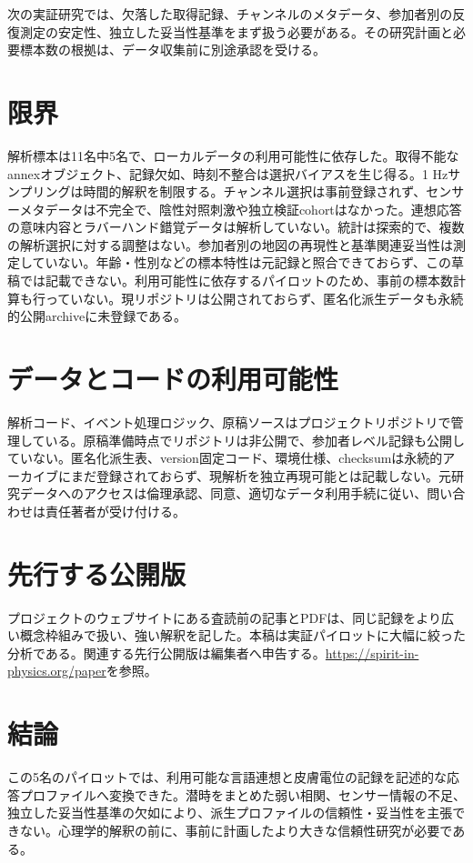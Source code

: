 \documentclass[a4paper,11pt]{article}
\begin{document}
次の実証研究では、欠落した取得記録、チャンネルのメタデータ、参加者別の反復測定の安定性、独立した妥当性基準をまず扱う必要がある。その研究計画と必要標本数の根拠は、データ収集前に別途承認を受ける。

\section{限界}
解析標本は11名中5名で、ローカルデータの利用可能性に依存した。取得不能なannexオブジェクト、記録欠如、時刻不整合は選択バイアスを生じ得る。1 Hzサンプリングは時間的解釈を制限する。チャンネル選択は事前登録されず、センサーメタデータは不完全で、陰性対照刺激や独立検証cohortはなかった。連想応答の意味内容とラバーハンド錯覚データは解析していない。統計は探索的で、複数の解析選択に対する調整はない。参加者別の地図の再現性と基準関連妥当性は測定していない。年齢・性別などの標本特性は元記録と照合できておらず、この草稿では記載できない。利用可能性に依存するパイロットのため、事前の標本数計算も行っていない。現リポジトリは公開されておらず、匿名化派生データも永続的公開archiveに未登録である。

\section{データとコードの利用可能性}
解析コード、イベント処理ロジック、原稿ソースはプロジェクトリポジトリで管理している。原稿準備時点でリポジトリは非公開で、参加者レベル記録も公開していない。匿名化派生表、version固定コード、環境仕様、checksumは永続的アーカイブにまだ登録されておらず、現解析を独立再現可能とは記載しない。元研究データへのアクセスは倫理承認、同意、適切なデータ利用手続に従い、問い合わせは責任著者が受け付ける。

\section{先行する公開版}
プロジェクトのウェブサイトにある査読前の記事とPDFは、同じ記録をより広い概念枠組みで扱い、強い解釈を記した。本稿は実証パイロットに大幅に絞った分析である。関連する先行公開版は編集者へ申告する。\url{https://spirit-in-physics.org/paper}を参照。

\section{結論}
この5名のパイロットでは、利用可能な言語連想と皮膚電位の記録を記述的な応答プロファイルへ変換できた。潜時をまとめた弱い相関、センサー情報の不足、独立した妥当性基準の欠如により、派生プロファイルの信頼性・妥当性を主張できない。心理学的解釈の前に、事前に計画したより大きな信頼性研究が必要である。

\begingroup\footnotesize


\endgroup
\end{document}
